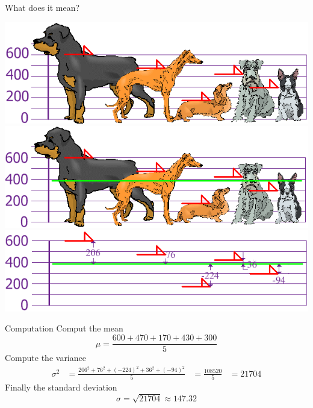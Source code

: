 \documentclass[10pt, compress]{beamer}
\begin{document}
\begin{frame}[t]{What does it mean?}
    \begin{center}
    \includegraphics[scale=0.3]{img/statistics-dogs-graph.png}\\
    \includegraphics[scale=0.3]{img/statistics-dogs-mean.png}\\
    \includegraphics[scale=0.3]{img/statistics-dogs-deviation.png}
    \end{center}
\end{frame}

\begin{frame}[t]{Computation}
    Comput the mean
    \begin{equation}
        \mu = \frac{600 + 470 + 170 + 430 + 300}{5}
    \end{equation}
    Compute the variance
    \begin{align}
        \sigma^2 &= \frac{206^2 + 76^2 + (-224)^2+ 36^2 + (-94)^2}{5}
                & = \frac{108520}{5}
                & = 21704
    \end{align}
    Finally the standard deviation
    \begin{equation}
        \sigma = \sqrt{21704} \approx 147.32
    \end{equation}
\end{frame}
\end{document}

